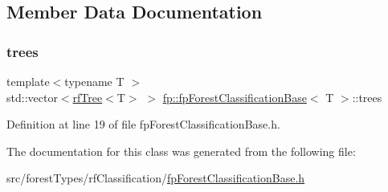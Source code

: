 \subsection{Member Data Documentation}
\mbox{\label{classfp_1_1fpForestClassificationBase_a51482a6c95c4b3cb42627f029c2d4662}} 
\subsubsection{\texorpdfstring{trees}{trees}}
{\footnotesize\ttfamily template$<$typename T $>$ \\
std\+::vector$<$\hyperlink{classfp_1_1rfTree}{rf\+Tree}$<$T$>$ $>$ \hyperlink{classfp_1_1fpForestClassificationBase}{fp\+::fp\+Forest\+Classification\+Base}$<$ T $>$\+::trees\hspace{0.3cm}{\ttfamily [protected]}}



Definition at line 19 of file fp\+Forest\+Classification\+Base.\+h.



The documentation for this class was generated from the following file\+:\begin{DoxyCompactItemize}
\item 
src/forest\+Types/rf\+Classification/\hyperlink{fpForestClassificationBase_8h}{fp\+Forest\+Classification\+Base.\+h}\end{DoxyCompactItemize}
